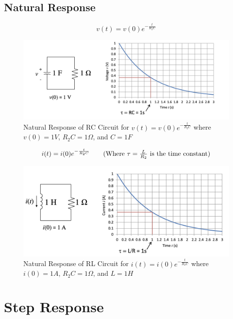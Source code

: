         \subsection{Natural Response}
            \begin{equation*}
                v(t) = v(0)e^{-\frac{t}{R_2 C}} \tag{Where $\tau = RC$ is the time constant}
            \end{equation*}
            \begin{figure}[H]
                \centering
                \includegraphics[width=0.6\linewidth]{chapters/figures/natural_response_rc.png}
                \caption{Natural Response of RC Circuit for $v(t) = v(0)e^{-\frac{t}{R_2 C}}$ where $v(0) = 1V$, $R_2 C = 1\Omega$, and $C = 1F$} 
            \end{figure}
            \begin{equation*}
                i(t) = i(0)e^{-\frac{t}{R_2 C}} \tag{Where $\tau = \frac{L}{R_2}$ is the time constant}
            \end{equation*}
            \begin{figure}[H]
                \centering
                \includegraphics[width=0.6\linewidth]{chapters/figures/natural_response_rl.png}
                \caption{Natural Response of RL Circuit for $i(t) = i(0)e^{-\frac{t}{R_2 C}}$ where $i(0) = 1A$, $R_2 C = 1\Omega$, and $L = 1H$}
            \end{figure}
    \section{Step Response}
